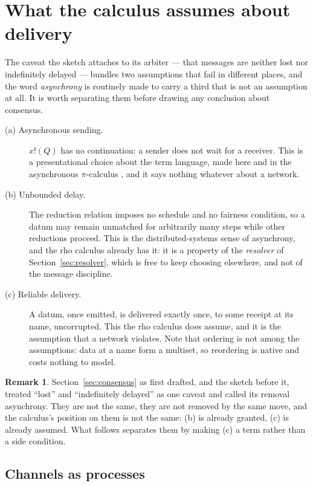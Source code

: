\documentclass[11pt]{article}
\theoremstyle{definition}
\newtheorem{remark}[theorem]{Remark}
\newcommand{\rhoc}{rho calculus}
\begin{document}
\section{What the calculus assumes about delivery}\label{sec:medium}

The caveat the sketch attaches to its arbiter --- that messages are neither lost nor indefinitely delayed --- bundles two assumptions that fail in different places, and the word \emph{asynchrony} is routinely made to carry a third that is not an assumption at all. It is worth separating them before drawing any conclusion about consensus.

\begin{description}
\item[(a) Asynchronous sending.] $x!(Q)$ has no continuation: a sender does not wait for a receiver. This is a presentational choice about the term language, made here and in the asynchronous $\pi$-calculus \cite{HondaTokoro,Boudol}, and it says nothing whatever about a network.
\item[(b) Unbounded delay.] The reduction relation imposes no schedule and no fairness condition, so a datum may remain unmatched for arbitrarily many steps while other reductions proceed. This is the distributed-systems sense of asynchrony, and the \rhoc{} already has it: it is a property of the \emph{resolver} of Section~\ref{sec:resolver}, which is free to keep choosing elsewhere, and not of the message discipline.
\item[(c) Reliable delivery.] A datum, once emitted, is delivered exactly once, to some receipt at its name, uncorrupted. This the \rhoc{} does assume, and it is the assumption that a network violates. Note that ordering is not among the assumptions: data at a name form a multiset, so reordering is native and costs nothing to model.
\end{description}

\begin{remark}
Section~\ref{sec:consensus} as first drafted, and the sketch before it, treated ``lost'' and ``indefinitely delayed'' as one caveat and called its removal asynchrony. They are not the same, they are not removed by the same move, and the calculus's position on them is not the same: (b) is already granted, (c) is already assumed. What follows separates them by making (c) a term rather than a side condition.
\end{remark}

\subsection{Channels as processes}
\end{document}
